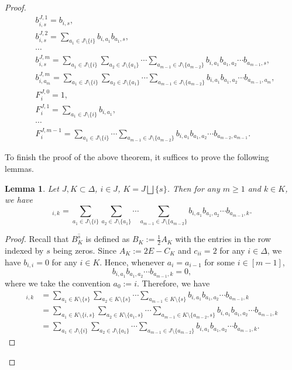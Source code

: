 \documentclass[11pt, letterpaper]{amsart}
\numberwithin{equation}{section}
\newtheorem{lemma}[theorem]{Lemma}
\begin{document}
\begin{proof}
    \begin{align*}
&b_{i,s}^{J,1}=
b_{i,s},\\
&b_{i,s}^{J,2}=\sum_{a_1\in J\setminus\{i\}}
b_{i,a_1}b_{a_1,s},\\
&\cdots\\
&b_{i,s}^{J,m}=\sum_{a_1\in J\setminus\{i\}}\sum_{a_2\in J\setminus\{a_1\}}\cdots\sum_{a_{m-1}\in J\setminus\{a_{m-2}\}}
b_{i,a_1}b_{a_1,a_2}\cdots b_{a_{m-1},s},\\
&b_{i,a_m}^{J,m}=\sum_{a_1\in J\setminus\{i\}}\sum_{a_2\in J\setminus\{a_1\}}\cdots\sum_{a_{m-1}\in J\setminus\{a_{m-2}\}}
b_{i,a_1}b_{a_1,a_2}\cdots b_{a_{m-1},a_m},\\
&F_i^{J,0}=1,\\
&F_i^{J,1}=\sum_{a_1\in J\setminus\{i\}}b_{i,a_1},\\
&\cdots\\
&F_i^{J,m-1}
=\sum_{a_1\in J\setminus\{i\}}\cdots\sum_{a_{m-1}\in J\setminus\{a_{m-2}\}}
b_{i,a_1}b_{a_1,a_2}\cdots b_{a_{m-2},a_{m-1}}.
    \end{align*} 


To finish the proof of the above theorem, it suffices to prove the following lemmas.

\begin{lemma} \label{lemma-matrixpower}
Let $J,K\subset \Delta$, $i\in J$, $K=J \bigsqcup \{s\}$. Then for any $m\geq 1$ and $k\in K$, we have
\begin{equation*}
[(B_{K}^{\widehat{s}})^m]_{i,k}=\sum_{a_1\in J\setminus\{i\}}\sum_{a_2\in J\setminus\{a_1\}}\cdots\sum_{a_{m-1}\in J\setminus\{a_{m-2}\}}
b_{i,a_1}b_{a_1,a_2}\cdots b_{a_{m-1},k}.
\end{equation*}
\end{lemma}

\begin{proof}
    Recall that $B_K^{\widehat{s}}$ is defined as $B_K:=\frac{1}{2}A_K$ with the entries in the row indexed by $s$ being zeros. Since $A_K:=2E-C_K$ and $c_{ii}=2$ for any $i\in\Delta$, we have $b_{i,i}=0$ for any $i\in K$. Hence, whenever $a_{i}=a_{i-1}$ for some $i\in[m-1]$,  
    \[
    b_{i,a_1} b_{a_1,a_2} \cdots b_{a_{m-1},k} = 0,
    \]
    where we take the convention $a_0:=i$.
Therefore, we have
    \begin{align*}
        [(B_{K}^{\widehat{s}})^m]_{i,k}&=\sum_{a_1\in K\setminus\{s\}}\sum_{a_2\in K\setminus\{s\}}\cdots\sum_{a_{m-1}\in K\setminus\{s\}} b_{i,a_1}b_{a_1,a_2}\cdots b_{a_{m-1},k}\\
        &=\sum_{a_1\in K\setminus\{i,s\}}\sum_{a_2\in K\setminus\{a_1,s\}}\cdots\sum_{a_{m-1}\in K\setminus\{a_{m-2},s\}} b_{i,a_1}b_{a_1,a_2}\cdots b_{a_{m-1},k}\\
        &=\sum_{a_1\in J\setminus\{i\}}\sum_{a_2\in J\setminus\{a_1\}}\cdots\sum_{a_{m-1}\in J\setminus\{a_{m-2}\}}
b_{i,a_1}b_{a_1,a_2}\cdots b_{a_{m-1},k}.
    \end{align*}
\end{proof}


\end{proof}
\end{document}
